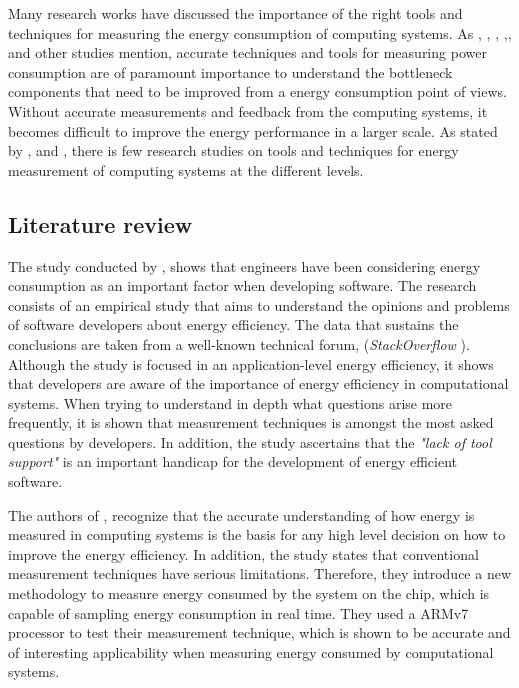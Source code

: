 Many research works have discussed the importance of the right tools and techniques for measuring the energy consumption of computing systems. As \cite{CYCLE_ENERGY}, \cite{QUESTIONS_ENERGY}, \cite{ACAT14ARMDAVID}, \cite{ACAT13ARM},\cite{ACAT}, \cite{WIRELESS_ENERGY} and other studies mention, accurate techniques and tools for measuring power consumption are of paramount importance to understand the bottleneck components that need to be improved from a energy consumption point of views. Without accurate measurements and feedback from the computing systems, it becomes difficult to improve the energy performance in a larger scale. As stated by  \cite{QUESTIONS_ENERGY}, \cite{CYCLE_ENERGY} and \cite{ACAT}, there is few research studies on tools and techniques for energy measurement of computing systems at the different levels.   


\subsection*{Literature review}
The study conducted by \cite{QUESTIONS_ENERGY}, shows that engineers have been
considering energy consumption as an important factor when developing software.
The research consists of an empirical study that aims to understand the opinions and
problems of software developers about energy efficiency. The data that sustains
the conclusions are  taken from
a well-known technical forum, (\textit{StackOverflow} \cite{STACKOVERFLOW}).
Although the study is focused in an application-level energy efficiency, it
shows that developers are aware of the importance of energy efficiency in 
computational systems. When trying to understand in depth what questions arise 
more frequently, it is shown that measurement techniques is amongst the most
asked questions by developers. In addition, the study ascertains that the 
\textit{"lack of tool support"} is an important handicap for the development of 
energy efficient software.

The authors of \cite{CYCLE_ENERGY}, recognize that the accurate understanding of how energy is measured in computing systems is the basis for any high level decision on how to improve the energy efficiency. In addition, the study states that conventional measurement techniques have serious limitations. Therefore, they introduce a new methodology to measure energy consumed by the system on the chip, which is capable of sampling energy consumption in real time. They used a ARMv7 processor to test their measurement technique, which is shown to be accurate and of interesting applicability when measuring energy consumed by computational systems.

